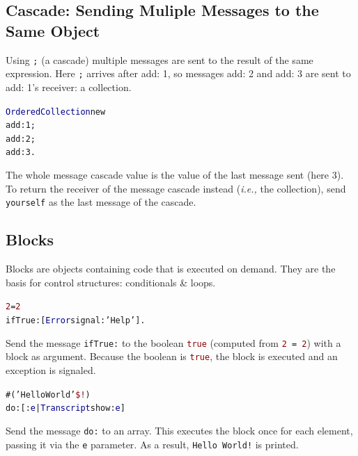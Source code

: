 \documentclass[notumble]{leaflet}
\makeatletter
\newcommand{\ie}{\emph{i.e.,}\xspace}
\newcommand{\ct}[1]{{\textsf{#1}}\xspace}
\newenvironment{displaycode}{%
     \par
     \hspace{1.5em}\begin{minipage}{\linewidth}
       \begin{alltt}\small}{
       \end{alltt}
     \end{minipage}
     \par}
\newcommand{\code}[1]{\foreignlanguage{english}{\texttt{#1}}}
\makeatother
\begin{document}
\vspace{-0.3cm}
\subsection{Cascade: Sending Muliple Messages to the Same Object}

Using \code{;} (a cascade) multiple messages are sent to the result of the  same expression.
Here \code{;} arrives after \ct{add: 1}, so messages \ct{add: 2} and \ct{add: 3} are sent to \ct{add: 1}'s receiver: a collection.
\begin{displaycode}
\textcolor{darkBlue}{OrderedCollection} new
  add: \textcolor{string}{1};
  add: \textcolor{string}{2};
  add: \textcolor{string}{3}.
\end{displaycode}

The whole message cascade value is the value of the last message sent (here 3). To return the receiver of the message cascade instead (\ie the collection), send
\code{yourself} as the last message of the cascade.

\vspace{-0.3cm}
\subsection{Blocks}
Blocks are objects containing code that is executed on demand. They are the basis for control structures:
conditionals \& loops.

\begin{displaycode}
\textcolor{darkRed}{2} = \textcolor{darkRed}{2}
  ifTrue: [ \textcolor{darkBlue}{Error} signal: \textcolor{string}{'Help'} ].
\end{displaycode}
Send the message \code{ifTrue:} to the boolean
\textcolor{darkRed}{\code{true}} (computed from
\code{\textcolor{darkRed}{2} = \textcolor{darkRed}{2}}) with a block
as argument. Because the boolean is \textcolor{darkRed}{\code{true}},
the block is executed and an exception is signaled.

\begin{displaycode}
\#(\textcolor{string}{'Hello World'} \textcolor{darkRed}{\$!})
  do: [ :\textcolor{darkBlue}{e} | \textcolor{darkBlue}{Transcript} show: \textcolor{darkBlue}{e} ]
\end{displaycode}

Send the message \code{do:} to an array. This executes the block
once for each element, passing it via the \code{e} parameter. As a
result, \code{\textcolor{string}{Hello~World!}} is printed.
\end{document}
